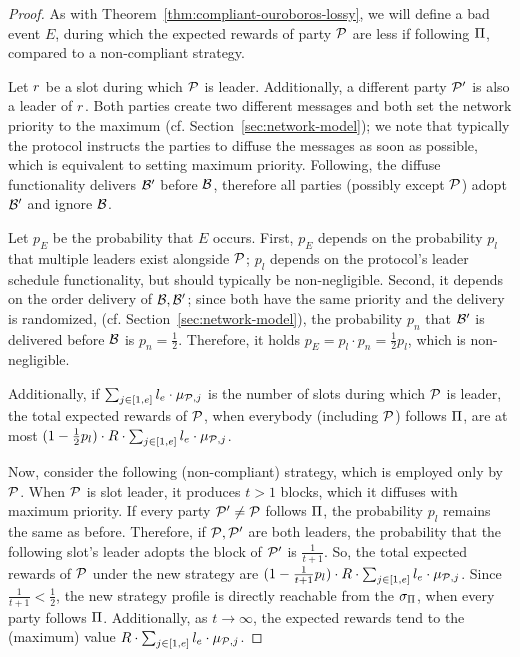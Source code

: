 \begin{proof}
    As with Theorem~\ref{thm:compliant-ouroboros-lossy}, we will define a bad
    event $E$, during which the expected rewards of party $\mathcal{P}$ are less
    if following $\Pi$, compared to a non-compliant strategy.

    Let $r$ be a slot during which $\mathcal{P}$ is leader. Additionally, a
    different party $\mathcal{P}'$ is also a leader of $r$. Both parties create
    two different messages and both set the network priority
    to the maximum (cf. Section~\ref{sec:network-model}); we note that typically the
    protocol instructs the parties to diffuse the messages as soon as possible,
    which is equivalent to setting maximum priority.
    Following, the
    diffuse functionality delivers $\mathcal{B}'$ before $\mathcal{B}$, therefore all
    parties (possibly except $\mathcal{P}$) adopt $\mathcal{B}'$ and ignore $\mathcal{B}$.

    Let $p_E$ be the probability that $E$ occurs. First, $p_E$ depends on the
    probability $p_l$ that multiple leaders exist alongside $\mathcal{P}$; $p_l$
    depends on the protocol's leader schedule functionality, but should
    typically be non-negligible. Second, it depends on the order delivery of
    $\mathcal{B}, \mathcal{B}'$; since both have the same priority and the delivery is
    randomized, (cf. Section~\ref{sec:network-model}), the probability $p_n$
    that $\mathcal{B}'$ is delivered before $\mathcal{B}$ is $p_n = \frac{1}{2}$.
    Therefore, it holds $p_E = p_l \cdot p_n = \frac{1}{2} p_l$, which is
    non-negligible.

    Additionally, if $\sum_{j \in [1, e]} l_e \cdot
    \mu_{\mathcal{P},j}$ is the number of slots during which $\mathcal{P}$ is
    leader, the total expected rewards of $\mathcal{P}$, when everybody (including
    $\mathcal{P}$) follows $\Pi$, are at most
    $(1 - \frac{1}{2} p_l) \cdot R \cdot \sum_{j \in [1, e]} l_e \cdot \mu_{\mathcal{P},j}$.

    Now, consider the following (non-compliant) strategy, which is employed only by $\mathcal{P}$. When $\mathcal{P}$ is slot
    leader, it produces $t > 1$ blocks, which it diffuses with maximum
    priority. If every party $\mathcal{P}' \neq \mathcal{P}$ follows $\Pi$, the
    probability $p_l$ remains the same as before. Therefore, if $\mathcal{P}, \mathcal{P}'$ are both leaders,
    the probability that the following slot's leader adopts the block of $\mathcal{P}'$ is $\frac{1}{t+1}$.
    So, the total expected
    rewards of $\mathcal{P}$ under the new strategy are
    $(1 - \frac{1}{t+1} p_l) \cdot R \cdot \sum_{j \in [1, e]} l_e \cdot \mu_{\mathcal{P},j}$.
    Since $\frac{1}{t+1} < \frac{1}{2}$, the new strategy profile is directly
    reachable from the $\sigma_\Pi$, when every party follows $\Pi$.
    Additionally, as $t \rightarrow \infty$, the expected rewards tend to the
    (maximum) value $R \cdot \sum_{j \in [1, e]} l_e \cdot
    \mu_{\mathcal{P},j}$.


\end{proof}
